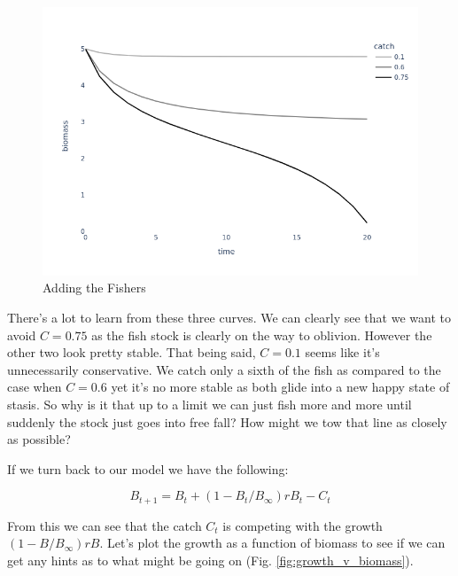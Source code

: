 \documentclass[11pt,a5paper]{book}
\begin{document}
\begin{figure}[h!] 
  \includegraphics[width=\linewidth]{notebooks/SurplusModels/adding_the_humans.png}
  \caption{Adding the Fishers}
  \label{fig:adding_the_fishers}
\end{figure}

There's a lot to learn from these three curves. We can clearly see that we want to avoid $C=0.75$ as the fish stock is clearly on the way to oblivion. However the other two look pretty stable. That being said, $C=0.1$ seems like it's unnecessarily conservative. We catch only a sixth of the fish as compared to the case when $C=0.6$ yet it's no more stable as both glide into a new happy state of stasis. So why is it that up to a limit we can just fish more and more until suddenly the stock just goes into free fall? How might we tow that line as closely as possible?
\newline

If we turn back to our model we have the following:

$$B_{t+1} = B_t + (1 - B_t/B_\infty)rB_t - C_t$$

From this we can see that the catch $C_t$ is competing with the growth $(1 - B/B_\infty)rB$. Let's plot the growth as a function of biomass to see if we can get any hints as to what might be going on (Fig. \ref{fig:growth_v_biomass}).
\newline
\end{document}
